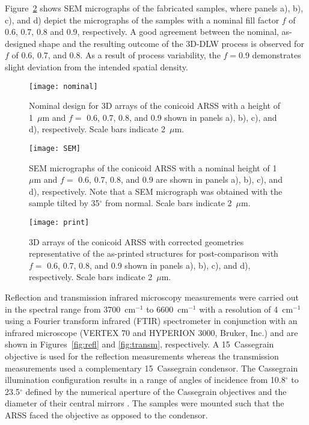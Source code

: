 \documentclass[9pt,twocolumn,twoside]{osajnl}
\begin{document}
Figure~\ref{fig:SEM} shows SEM micrographs of the fabricated samples, where panels a), b), c), and d) depict the micrographs of the samples with a nominal fill factor $f$ of 0.6, 0.7, 0.8 and 0.9, respectively. A good agreement between the nominal, as-designed shape and the resulting outcome of the 3D-DLW process is observed for  $f$ of 0.6, 0.7, and 0.8.  As a result of process variability, the $f=$0.9 demonstrates slight deviation from the intended spatial density. 

\begin{figure}[hbt]
	\centering
	\texttt{[image: nominal]}
	\caption{Nominal design for 3D arrays of the conicoid ARSS with a height of 1~$\mu$m and $f=$ 0.6, 0.7, 0.8, and 0.9 shown in panels a), b), c), and d), respectively. Scale bars indicate 2~$\mu$m. }
	\label{fig:nominal}
\end{figure} 

\begin{figure}[hbt]
	\centering
	\texttt{[image: SEM]}
	\caption{SEM micrographs of the conicoid ARSS with a nominal height of 1~$\mu$m and $f=$ 0.6, 0.7, 0.8, and 0.9 are shown in panels a), b), c), and d), respectively. Note that a SEM micrograph was obtained with the sample tilted by 35$^{\circ}$ from normal. Scale bars indicate  2~$\mu$m. }
	\label{fig:SEM}
\end{figure} 


\begin{figure}[hbt]
	\centering
	\texttt{[image: print]}
	\caption{3D arrays of the conicoid ARSS with corrected geometries representative of the as-printed structures for post-comparison with $f=$ 0.6, 0.7, 0.8, and 0.9 shown in panels a), b), c), and d), respectively. Scale bars indicate 2~$\mu$m. }
	\label{fig:print}
\end{figure} 


Reflection and transmission infrared microscopy measurements were carried out in the spectral range from 3700~cm$ ^{-1} $ to 6600~cm$ ^{-1} $ with a resolution of 4~cm$ ^{-1} $ using a Fourier transform infrared (FTIR) spectrometer in conjunction with an infrared microscope (VERTEX 70 and HYPERION 3000, Bruker, Inc.) and are shown in Figures~\ref{fig:refl} and \ref{fig:transm}, respectively. A 15\texttimes~Cassegrain objective is used for the reflection measurements whereas the transmission measurements used a complementary 15\texttimes~Cassegrain condensor. The Cassegrain illumination configuration results in a range of angles of incidence from 10.8$^{\circ}$ to 23.5$^{\circ}$ defined by the numerical aperture of the Cassegrain objectives and the diameter of their central mirrors \cite{HinrichsJPCC117_2013}. The samples were mounted such that the ARSS faced the objective as opposed to the condensor.
\end{document}
